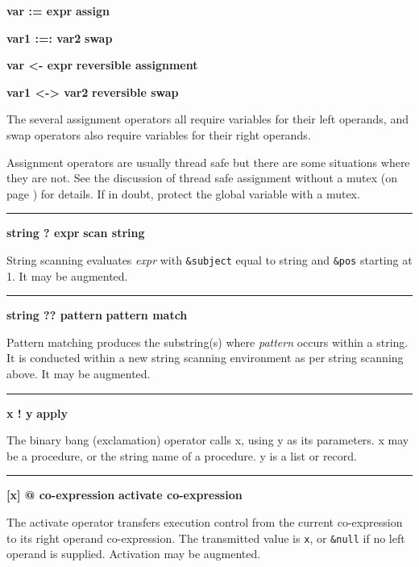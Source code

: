 \noindent
{\bf var := expr } \hfill {\bf assign}

\noindent
{\bf var1 :=: var2 } \hfill {\bf swap}\WarningNotThreadSafe
{}

\noindent
{\bf var {\textless}- expr } \hfill {\bf reversible assignment}

\noindent
{\bf var1 {\textless}-{\textgreater} var2 } \hfill {\bf reversible swap}\WarningNotThreadSafe
{}

\noindent
The several assignment
operators all require variables for their left operands, and swap
operators also require variables for their right operands.

Assignment operators are usually thread safe \ConcurrencyIssue
but there are some situations where they are not. 
See the discussion of thread safe assignment without a mutex (on page
\pageref{ThreadSafeAssignment}) for details. If in doubt, protect the
global variable with a mutex.

\bigskip\hrule\vspace{0.1cm}
\noindent
{\bf string ? expr } \hfill {\bf scan string}

\noindent
{}String scanning evaluates \textit{expr}
with \texttt{\&subject} equal to string and \texttt{\&pos} starting at
1. It may be augmented.

\bigskip\hrule\vspace{0.1cm}
\noindent
{\bf string ?? pattern } \hfill {\bf pattern match}

\noindent
{}Pattern matching produces the substring(s) where
\textit{pattern} occurs within a string. It is conducted within a new
string scanning environment as per string scanning above. It may be augmented.

\bigskip\hrule\vspace{0.1cm}
\noindent
{\bf x ! y } \hfill {\bf apply}

\noindent
{}The binary bang (exclamation) operator calls x,
using y as its parameters.  x may be a procedure, or the string name of
a procedure.  y is a list or record.

\bigskip\hrule\vspace{0.1cm}
\noindent
{\bf [x] @ co-expression } \hfill {\bf activate co-expression}

\noindent
The activate operator transfers execution
control from the current co-expression to its right operand
co-expression. The transmitted value is \texttt{x}, or \texttt{\&null}
if no left operand is supplied. Activation may be augmented.

